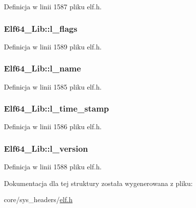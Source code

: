 Definicja w linii 1587 pliku elf.\-h.

\hypertarget{struct_elf64___lib_ac78fa7eafc377b04fcaf575c61dc2b60}{
\subsubsection[{l\-\_\-flags}]{ Elf64\-\_\-\-Lib\-::l\-\_\-flags}}\label{struct_elf64___lib_ac78fa7eafc377b04fcaf575c61dc2b60}


Definicja w linii 1589 pliku elf.\-h.

\hypertarget{struct_elf64___lib_ac7f21d23c86f56c6583aa563eb960af0}{
\subsubsection[{l\-\_\-name}]{ Elf64\-\_\-\-Lib\-::l\-\_\-name}}\label{struct_elf64___lib_ac7f21d23c86f56c6583aa563eb960af0}


Definicja w linii 1585 pliku elf.\-h.

\hypertarget{struct_elf64___lib_ace001f85c3f31e91fedf4a1a1f923af5}{
\subsubsection[{l\-\_\-time\-\_\-stamp}]{ Elf64\-\_\-\-Lib\-::l\-\_\-time\-\_\-stamp}}\label{struct_elf64___lib_ace001f85c3f31e91fedf4a1a1f923af5}


Definicja w linii 1586 pliku elf.\-h.

\hypertarget{struct_elf64___lib_ab03d7034a6f1113717a9eefe33cb8343}{
\subsubsection[{l\-\_\-version}]{ Elf64\-\_\-\-Lib\-::l\-\_\-version}}\label{struct_elf64___lib_ab03d7034a6f1113717a9eefe33cb8343}


Definicja w linii 1588 pliku elf.\-h.



Dokumentacja dla tej struktury została wygenerowana z pliku\-:\begin{DoxyCompactItemize}
\item 
core/sys\-\_\-headers/\hyperlink{elf_8h}{elf.\-h}\end{DoxyCompactItemize}
